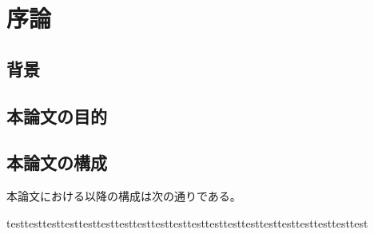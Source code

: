 \chapter{序論}
\label{chap:introduction}

\section{背景}
\label{section:background}

\section{本論文の目的}


\section{本論文の構成}

本論文における以降の構成は次の通りである。

testtesttesttesttesttesttesttesttesttesttesttesttesttesttesttesttesttesttesttest
